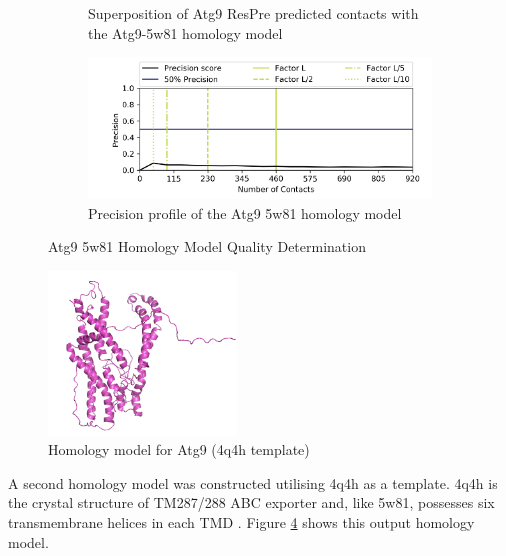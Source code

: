\begin{figure}[htb]
\begin{subfigure}{0.45\textwidth}
  \caption{Superposition of Atg9 ResPre predicted contacts with the Atg9-5w81 homology model}
  \label{fig:5w81_hom_cmap_super}
\end{subfigure}\hfil %
\begin{subfigure}{0.75\textwidth}
    \includegraphics[width=\linewidth]{Modelling of Atg9/prec_5w81_respre.png}
    \caption{Precision profile of the Atg9 5w81 homology model}
    \label{fig:prec_5w81}
\end{subfigure}\hfil %
\caption{Atg9 5w81 Homology Model Quality Determination}
\small
\label{fig:atg9_5w81_quality}
\end{figure}


\begin{figure}[th!]
    \centering
    \includegraphics[width=50mm, scale=0.5]{Modelling of Atg9/atg9_hmo_4q4h.png}
    \caption{Homology model for Atg9 (4q4h template)}
    \label{fig:4q4h_hmo}
    \small
\end{figure}

A second homology model was constructed utilising 4q4h as a template. 4q4h is the crystal structure of TM287/288 ABC exporter and, like 5w81, possesses six transmembrane helices in each TMD \cite{hohl2014structural}.  Figure \ref{fig:4q4h_hmo} shows this output homology model.

